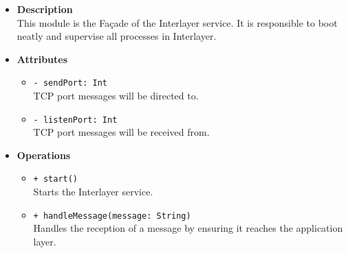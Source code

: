 \FloatBarrier
\begin{itemize}
  \item \textbf{Description} \\
    This module is the Fa\c cade of the Interlayer service. It is responsible
    to boot neatly and supervise all processes in Interlayer.
  \item \textbf{Attributes}
    \begin{itemize}
      \item \texttt{- sendPort: Int} \\
    TCP port messages will be directed to.
      \item \texttt{- listenPort: Int} \\
    TCP port messages will be received from.
    \end{itemize}
  \item \textbf{Operations}
  \begin{itemize}
    \item \texttt{+ start()} \\
    Starts the Interlayer service.
    \item \texttt{+ handleMessage(message: String)} \\
    Handles the reception of a message by ensuring it reaches the application
    layer.
  \end{itemize}
\end{itemize}

